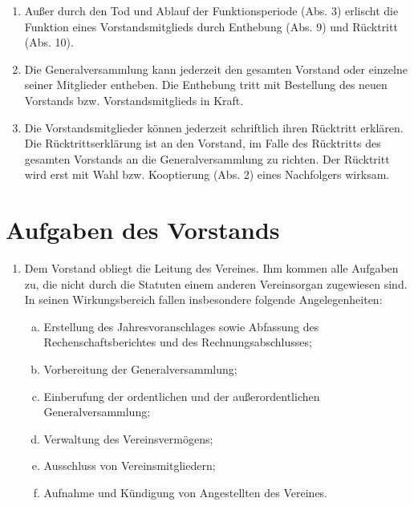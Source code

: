 \documentclass[a4paper,12pt]{article}
\begin{document}
\begin{enumerate}
\item Außer durch den Tod und Ablauf der Funktionsperiode (Abs. 3) erlischt die Funktion eines Vorstandsmitglieds durch Enthebung (Abs. 9) und Rücktritt (Abs. 10).
\item Die Generalversammlung kann jederzeit den gesamten Vorstand oder einzelne seiner Mitglieder entheben. Die Enthebung tritt mit Bestellung des neuen Vorstands bzw. Vorstandsmitglieds in Kraft.
\item Die Vorstandsmitglieder können jederzeit schriftlich ihren Rücktritt erklären. Die Rücktrittserklärung ist an den Vorstand, im Falle des Rücktritts des gesamten Vorstands an die Generalversammlung zu richten. Der Rücktritt wird erst mit Wahl bzw. Kooptierung (Abs. 2) eines Nachfolgers wirksam.
\end{enumerate}

\section{Aufgaben des Vorstands} %
\begin{enumerate}
\item Dem Vorstand obliegt die Leitung des Vereines. Ihm kommen alle Aufgaben zu, die nicht durch die Statuten einem anderen Vereinsorgan zugewiesen sind. In seinen Wirkungsbereich fallen insbesondere folgende Angelegenheiten:
	\begin{enumerate}[(a)]
	\item Erstellung des Jahresvoranschlages sowie Abfassung des Rechenschaftsberichtes und des Rechnungsabschlusses;
	\item Vorbereitung der Generalversammlung;
	\item Einberufung der ordentlichen und der außerordentlichen Generalversammlung;
	\item Verwaltung des Vereinsvermögens;
	\item Ausschluss von Vereinsmitgliedern;
	\item Aufnahme und Kündigung von Angestellten des Vereines.
	\end{enumerate}
\end{enumerate}
\end{document}
